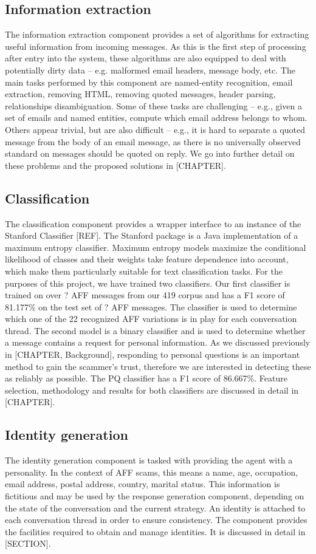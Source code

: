 \subsection*{Information extraction}
The information extraction component provides a set of algorithms for extracting useful information from incoming messages. As this is the first step of processing after entry into the system, these algorithms are also equipped to deal with potentially dirty data -- e.g. malformed email headers, message body, etc. The main tasks performed by this component are named-entity recognition, email extraction, removing HTML, removing quoted messages, header parsing, relationships disambiguation. Some of these tasks are challenging -- e.g., given a set of emails and named entities, compute which email address belongs to whom. Others appear trivial, but are also difficult -- e.g., it is hard to separate a quoted message from the body of an email message, as there is no universally observed standard on messages should be quoted on reply. We go into further detail on these problems and the proposed solutions in [CHAPTER].

\subsection*{Classification}
The classification component provides a wrapper interface to an instance of the Stanford Classifier [REF]. The Stanford package is a Java implementation of a maximum entropy classifier. Maximum entropy models maximize the conditional likelihood of classes and their weights take feature dependence into account, which make them particularly suitable for text classification tasks. For the purposes of this project, we have trained two classifiers. Our first classifier is trained on over ? AFF messages from our 419 corpus and has a F1 score of  81.177\% on the test set of ? AFF messages. The classifier is used to determine which one of the 22 recognized AFF variations is in play for each conversation thread. The second model is a binary classifier and is used to determine whether a message contains a request for personal information. As we discussed previously in [CHAPTER, Background], responding to personal questions is an important method to gain the scammer's trust, therefore we are interested in detecting these as reliably as possible. The PQ classifier has a F1 score of 86.667\%. Feature selection, methodology and results for both classifiers are discussed in detail in [CHAPTER].

\subsection*{Identity generation}
The identity generation component is tasked with providing the agent with a personality. In the context of AFF scams, this means a name, age, occupation, email address, postal address, country, marital status. This information is fictitious and may be used by the response generation component, depending on the state of the conversation and the current strategy. An identity is attached to each conversation thread in order to ensure consistency. The component provides the facilities required to obtain and manage identities. It is discussed in detail in [SECTION].

